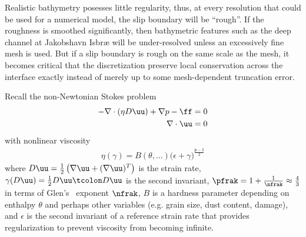 Realistic bathymetry posesses little regularity, thus, at every resolution that could be used for a numerical model, the slip boundary will be ``rough''.
If the roughness is smoothed significantly, then bathymetric features such as the deep channel at Jakobshavn Isbr{\ae} will be under-resolved unless an excessively fine mesh is used.
But if a slip boundary is rough on the same scale as the mesh, it becomes critical that the discretization preserve local conservation across the interface exactly instead of merely up to some mesh-dependent truncation error.

Recall the non-Newtonian Stokes problem
\begin{align}\label{eq:slip:stokes-strong}
    -\nabla \cdot(\eta D\uu) + \nabla p - \ff &= 0 \\
    \nabla \cdot \uu &= 0
\end{align}
with nonlinear viscosity
\begin{gather}
  \eta(\gamma) = B(\theta,\dotsc)\big(\epsilon + \gamma \big)^{\frac{\mathfrak{p}-2}{2}}
\end{gather}
where $D\uu = \tfrac 1 2 \left(\nabla \uu + (\nabla \uu)^T \right)$ is the strain rate, $\gamma(D\uu) = \tfrac 1 2 D\uu \tcolon D\uu$ is the second invariant, $\pfrak = 1 + \tfrac{1}{\nfrak} \approx \tfrac 4 3$ in terms of Glen's~\citeyearpar{glen1955creep} exponent $\nfrak$, $B$ is a hardness parameter depending on enthalpy $\theta$ and perhaps other variables (e.g. grain size, dust content, damage), and $\epsilon$ is the second invariant of a reference strain rate that provides regularization to prevent viscosity from becoming infinite.

